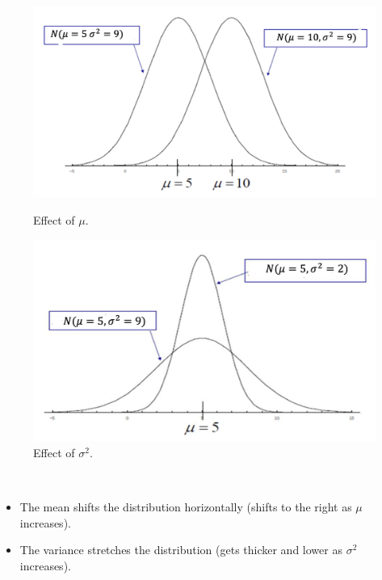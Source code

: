 \begin{figure}[!htb]
    \begin{minipage}{0.48\textwidth}
      \centering
      \includegraphics[width=1\linewidth, height=0.2\textheight]{img/effect-of-mean.png}
      \caption{Effect of $\mu$.}
    \end{minipage}\hfill
    \begin{minipage}{0.48\textwidth}
      \centering
      \includegraphics[width=1\linewidth]{img/effect-of-var.png}
      \caption{Effect of $\sigma^2$.}
    \end{minipage}
 \end{figure}

 \pagebreak

 \begin{note}
    \phantom{}\
    \begin{itemize}
        \item The mean shifts the distribution horizontally (shifts to the right as $\mu$ increases).
        \item The variance stretches the distribution (gets thicker and lower as $\sigma^2$ increases). 
    \end{itemize}
 \end{note}

